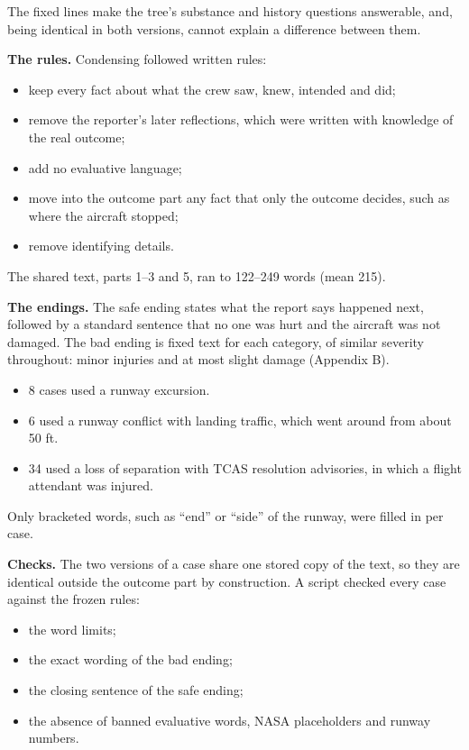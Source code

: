 \documentclass[review,12pt]{elsarticle}
\providecommand{\tightlist}{\setlength{\itemsep}{0pt}\setlength{\parskip}{0pt}}
\begin{document}
The fixed lines make the tree's substance and history questions answerable, and, being identical in both versions, cannot explain a difference between them.

\textbf{The rules.} Condensing followed written rules:

\begin{itemize}
\tightlist
\item
  keep every fact about what the crew saw, knew, intended and did;
\item
  remove the reporter's later reflections, which were written with knowledge of the real outcome;
\item
  add no evaluative language;
\item
  move into the outcome part any fact that only the outcome decides, such as where the aircraft stopped;
\item
  remove identifying details.
\end{itemize}

The shared text, parts 1--3 and 5, ran to 122--249 words (mean 215).

\textbf{The endings.} The safe ending states what the report says happened next, followed by a standard sentence that no one was hurt and the aircraft was not damaged. The bad ending is fixed text for each category, of similar severity throughout: minor injuries and at most slight damage (Appendix B).

\begin{itemize}
\tightlist
\item
  8 cases used a runway excursion.
\item
  6 used a runway conflict with landing traffic, which went around from about 50 ft.
\item
  34 used a loss of separation with TCAS resolution advisories, in which a flight attendant was injured.
\end{itemize}

Only bracketed words, such as ``end'' or ``side'' of the runway, were filled in per case.

\textbf{Checks.} The two versions of a case share one stored copy of the text, so they are identical outside the outcome part by construction. A script checked every case against the frozen rules:

\begin{itemize}
\tightlist
\item
  the word limits;
\item
  the exact wording of the bad ending;
\item
  the closing sentence of the safe ending;
\item
  the absence of banned evaluative words, NASA placeholders and runway numbers.
\end{itemize}
\end{document}
